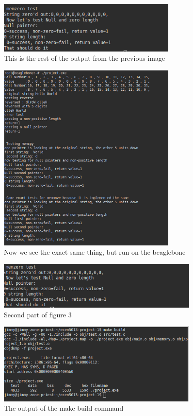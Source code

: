 \documentclass{article}
\begin{document}
\begin{figure}[H]
    \centering
    \includegraphics[width=0.8\textwidth]{x86_exe_pic2.png}
    \caption{This is the rest of the output from the previous image}
\end{figure}

\begin{figure}[H]
    \centering
    \includegraphics[width=0.8\textwidth]{beaglebone_exe_pic1.png}
    \caption{Now we see the exact same thing, but run on the beaglebone}
\end{figure}

\begin{figure}[H]
    \centering
    \includegraphics[width=0.9\textwidth]{beaglebone_exe_pic2.png}
    \caption{Second part of figure 3}
\end{figure}

\begin{figure}[H]
    \centering
    \includegraphics[width=0.9\textwidth]{make_build_all.png}
    \caption{The output of the make build command}
\end{figure}
\end{document}

